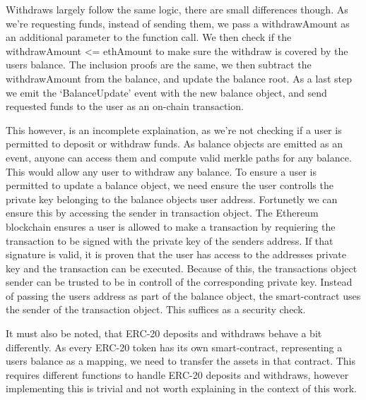 \documentclass[../../thesis.tex]{subfiles}
\begin{document}
Withdraws largely follow the same logic, there are small differences though. As we're requesting funds, instead of sending them, we pass a withdrawAmount as an additional parameter to the function call. We then check if the withdrawAmount <= ethAmount to make sure the withdraw is covered by the users balance. The inclusion proofs are the same, we then subtract the withdrawAmount from the balance, and update the balance root. As a last step we emit the `BalanceUpdate' event with the new balance object, and send requested funds to the user as an on-chain transaction.

This however, is an incomplete explaination, as we're not checking if a user is permitted to deposit or withdraw funds. As balance objects are emitted as an event, anyone can access them and compute valid merkle paths for any balance. This would allow any user to withdraw any balance. To ensure a user is permitted to update a balance object, we need ensure the user controlls the private key belonging to the balance objects user address. Fortunetly we can ensure this by accessing the sender in transaction object. The Ethereum blockchain ensures a user is allowed to make a transaction by requiering the transaction to be signed with the private key of the senders address. If that signature is valid, it is proven that the user has access to the addresses private key and the transaction can be executed. Because of this, the transactions object sender can be trusted to be in controll of the corresponding private key. Instead of passing the users address as part of the balance object, the smart-contract uses the sender of the transaction object. This suffices as a security check.

It must also be noted, that ERC-20 deposits and withdraws behave a bit differently. As every ERC-20 token has its own smart-contract, representing a users balance as a mapping, we need to transfer the assets in that contract. This requires different functions to handle ERC-20 deposits and withdraws, however implementing this is trivial and not worth explaining in the context of this work. 
\end{document}
